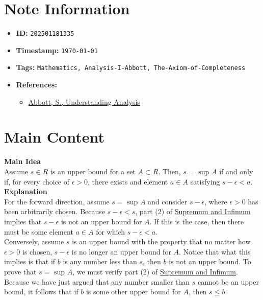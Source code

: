 \clearpage
{}
\label{202501181335}
\renewcommand{\notetitle}{Alternative Phrasing for Supremum}

\section*{Note Information}
\begin{itemize}
  \item \textbf{ID:} \texttt{202501181335}
  \item \textbf{Timestamp:} \texttt{\today \ \currenttime}
  \item \textbf{Tags:} \texttt{Mathematics, Analysis-I-Abbott, The-Axiom-of-Completeness}
  \item \textbf{References:}
    \begin{itemize}
      \item \href{/home/garrett/Personal/References/Mathematics/Analysis-I/Abbott.pdf}{Abbott, S., Understanding Analysis}
    \end{itemize}
\end{itemize}


\section*{Main Content}
\textbf{Main Idea}\\
Assume $s \in R$ is an upper bound for a set $A \subset R$. Then, $s = \text{ sup } A$ if and only if, for every choice of $\epsilon > 0$, there exists and element $a \in A$ satisfying $s - \epsilon < a$.\\

\textbf{Explanation}\\
For the forward direction, assume $s = \text{ sup } A$ and consider $s - \epsilon$, where $\epsilon > 0$ has been arbitrarily chosen. Because $s - \epsilon < s$, part (2) of \hyperref[202501180743]{Supremum and Infimum} implies that $s - \epsilon$ is not an upper bound for $A$. If this is the case, then there must be some element $a \in A$ for which $s - \epsilon < a$.\\
Conversely, assume $s$ is an upper bound with the property that no matter how $\epsilon > 0$ is chosen, $s - \epsilon$ is no longer an upper bound for $A$. Notice that what this implies is that if $b$ is any number less than $s$, then $b$ is not an upper bound. To prove that $s = \text{ sup } A$, we must verify part (2) of \hyperref[202501180743]{Supremum and Infimum}. Because we have just argued that any number smaller than $s$ cannot be an upper bound, it follows that if $b$ is some other upper bound for $A$, then $s \leq b$. 


